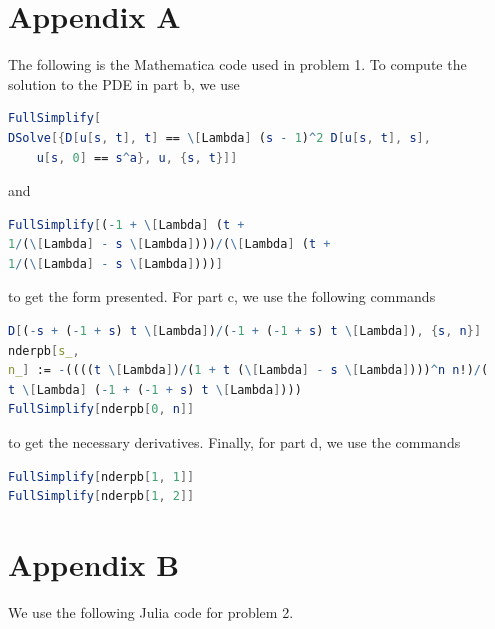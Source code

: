 \documentclass{article}
\begin{document}
\section{Appendix A}
The following is the Mathematica code used in problem 1. To compute the solution to the PDE in part b, we use
\begin{lstlisting}[language=Mathematica]
FullSimplify[
DSolve[{D[u[s, t], t] == \[Lambda] (s - 1)^2 D[u[s, t], s], 
	u[s, 0] == s^a}, u, {s, t}]]
\end{lstlisting}
and 
\begin{lstlisting}[language=Mathematica]
FullSimplify[(-1 + \[Lambda] (t + 
1/(\[Lambda] - s \[Lambda])))/(\[Lambda] (t + 
1/(\[Lambda] - s \[Lambda])))]
\end{lstlisting}
to get the form presented. For part c, we use the following commands
\begin{lstlisting}[language=Mathematica]
D[(-s + (-1 + s) t \[Lambda])/(-1 + (-1 + s) t \[Lambda]), {s, n}]
nderpb[s_, 
n_] := -((((t \[Lambda])/(1 + t (\[Lambda] - s \[Lambda])))^n n!)/(
t \[Lambda] (-1 + (-1 + s) t \[Lambda])))
FullSimplify[nderpb[0, n]]
\end{lstlisting}
to get the necessary derivatives. Finally, for part d, we use the commands
\begin{lstlisting}[language=Mathematica]
FullSimplify[nderpb[1, 1]]
FullSimplify[nderpb[1, 2]]
\end{lstlisting}

\section{Appendix B}
We use the following Julia code for problem 2. 
\end{document}
